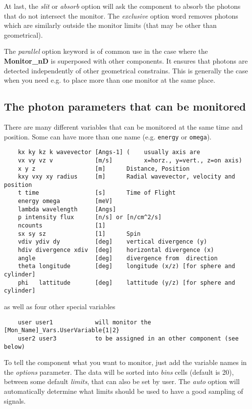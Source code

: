 At last, the \textit{slit} or \textit{absorb} option will ask the component to
absorb the photons that do not intersect the monitor. The \textit{exclusive} option word removes photons which are similarly outside the monitor limits (that may be other than geometrical).

The \textit{parallel} option keyword is of common use in the case where the \textbf{Monitor\_nD} is superposed with other components. It ensures that photons are detected independently of other geometrical constrains. This is generally the case when you need e.g. to place more than one monitor at the same place.

\subsection{The photon parameters that can be monitored}

There are many different variables that can be monitored at the same time
and position. Some can have more than one name (e.g. \texttt{energy} or
\texttt{omega}).


\begin{verbatim}
    kx ky kz k wavevector [Angs-1] (    usually axis are
    vx vy vz v            [m/s]         x=horz., y=vert., z=on axis)
    x y z                 [m]      Distance, Position
    kxy vxy xy radius     [m]      Radial wavevector, velocity and position
    t time                [s]      Time of Flight
    energy omega          [meV]
    lambda wavelength     [Angs]
    p intensity flux      [n/s] or [n/cm^2/s]
    ncounts               [1]
    sx sy sz              [1]      Spin
    vdiv ydiv dy          [deg]    vertical divergence (y)
    hdiv divergence xdiv  [deg]    horizontal divergence (x)
    angle                 [deg]    divergence from  direction
    theta longitude       [deg]    longitude (x/z) [for sphere and cylinder]
    phi   lattitude       [deg]    lattitude (y/z) [for sphere and cylinder]
\end{verbatim}
as well as four other special variables
\begin{verbatim}
    user user1            will monitor the [Mon_Name]_Vars.UserVariable{1|2}
    user2 user3           to be assigned in an other component (see below)
\end{verbatim}

To tell the component what you want to monitor, just add the variable
names in the \textit{options} parameter. The data will be sorted into \textit{
  bins} cells (default is 20), between some default \textit{limits}, that
can also be set by user. The \textit{auto} option will automatically
determine what limits should be used to have a good sampling of signals.

